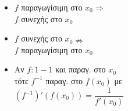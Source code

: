 \documentclass[11pt]{article}
\begin{document}
\begin{minipage}{6.8cm}

\begin{itemize}
\item $f$ παραγωγίσιμη στο $x_0\Rightarrow$\\$f$ συνεχής στο $x_0$
\item $f$ συνεχής στο $x_0\nRightarrow$\\$f$ παραγωγίσιμη στο $x_0$
\item Αν $f: 1-1$ και παραγ. στο $x_0$\\ τότε $f^{-1}$ παραγ. στο $f(x_0)$ με\\
$(f^{-1})'(f(x_0))=\dfrac{1}{f'(x_0)}$
\end{itemize}
\end{minipage}
\end{document}
